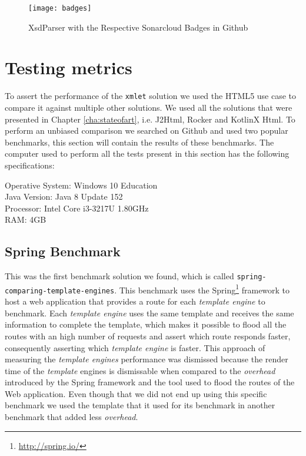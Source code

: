 \begin{figure}[h]
	\centering
	\texttt{[image: badges]}
	\caption{XsdParser with the Respective Sonarcloud Badges in Github}
	\label{project_badges}
\end{figure}

\section{Testing metrics} %
\label{sec:testingmetrics}

To assert the performance of the \texttt{xmlet} solution we used the \ac{HTML}5 use case to compare it against multiple other solutions. We used all the solutions that were presented in Chapter \ref{cha:stateofart}, i.e. J2Html, Rocker and KotlinX Html. To perform an unbiased comparison we searched on Github and used two popular benchmarks, this section will contain the results of these benchmarks. The computer used to perform all the tests present in this section has the following specifications:

Operative System: Windows 10 Education\\
Java Version: Java 8 Update 152\\
Processor: Intel Core i3-3217U 1.80GHz\\
RAM: 4GB

\subsection{Spring Benchmark}
\label{sec:springbenchmark}

This was the first benchmark solution we found, which is called \texttt{spring-comparing-template-engines}\cite{springbenchmark}. This benchmark uses the Spring\footnote{\url{http://spring.io/}} framework to host a web application that provides a route for each \textit{template engine} to benchmark. Each \textit{template engine} uses the same template and receives the same information to complete the template, which makes it possible to flood all the routes with an high number of requests and assert which route responds faster, consequently asserting which \textit{template engine} is faster. This approach of measuring the \textit{template engines} performance was dismissed because the render time of the \textit{template} engines is dismissable when compared to the \textit{overhead} introduced by the Spring framework and the tool used to flood the routes of the Web application. Even though that we did not end up using this specific benchmark we used the template that it used for its benchmark in another benchmark that added less \textit{overhead}.

